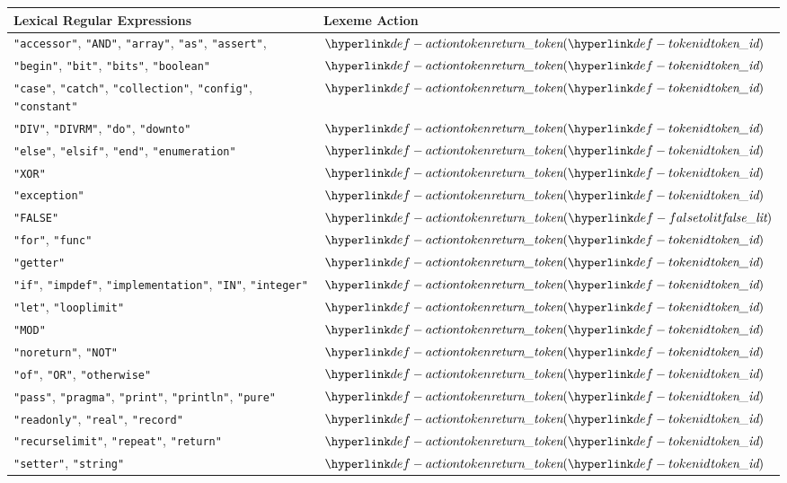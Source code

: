 \begin{center}
\begin{tabular}{ll}
\textbf{Lexical Regular Expressions} & \textbf{Lexeme Action}\\
\hline
\texttt{"accessor"}, \texttt{"AND"}, \texttt{"array"}, \texttt{"as"}, \texttt{"assert"},      & $\actiontoken(\tokenid)$ \\
\texttt{"begin"}, \texttt{"bit"}, \texttt{"bits"}, \texttt{"boolean"}       & $\actiontoken(\tokenid)$ \\
\texttt{"case"}, \texttt{"catch"}, \texttt{"collection"}, \texttt{"config"}, \texttt{"constant"}      & $\actiontoken(\tokenid)$ \\
\texttt{"DIV"}, \texttt{"DIVRM"}, \texttt{"do"}, \texttt{"downto"}        & $\actiontoken(\tokenid)$ \\
\texttt{"else"}, \texttt{"elsif"}, \texttt{"end"}, \texttt{"enumeration"}   & $\actiontoken(\tokenid)$ \\
\texttt{"XOR"}           & $\actiontoken(\tokenid)$ \\
\texttt{"exception"}     & $\actiontoken(\tokenid)$ \\
\texttt{"FALSE"} & $\actiontoken(\falsetolit)$  \\
\texttt{"for"}, \texttt{"func"}          & $\actiontoken(\tokenid)$ \\
\texttt{"getter"}        & $\actiontoken(\tokenid)$ \\
\texttt{"if"}, \texttt{"impdef"}, \texttt{"implementation"}, \texttt{"IN"}, \texttt{"integer"}       & $\actiontoken(\tokenid)$ \\
\texttt{"let"}, \texttt{"looplimit"}           & $\actiontoken(\tokenid)$ \\
\texttt{"MOD"}           & $\actiontoken(\tokenid)$ \\
\texttt{"noreturn"}, \texttt{"NOT"}           & $\actiontoken(\tokenid)$ \\
\texttt{"of"},      \texttt{"OR"},      \texttt{"otherwise"}                  & $\actiontoken(\tokenid)$ \\
\texttt{"pass"},    \texttt{"pragma"},  \texttt{"print"}, \texttt{"println"}, \texttt{"pure"}                      & $\actiontoken(\tokenid)$ \\
\texttt{"readonly"}, \texttt{"real"},    \texttt{"record"}  & $\actiontoken(\tokenid)$ \\
\texttt{"recurselimit"}, \texttt{"repeat"}, \texttt{"return"}  & $\actiontoken(\tokenid)$ \\
\texttt{"setter"},  \texttt{"string"}                  & $\actiontoken(\tokenid)$ \\

\end{tabular}
\end{center}
